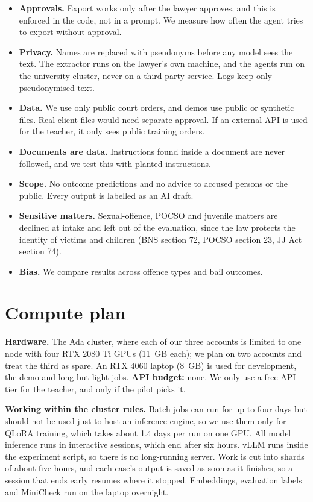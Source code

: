 \documentclass[11pt,a4paper]{article}
\begin{document}
\begin{itemize}
\item \textbf{Approvals.} Export works only after the lawyer approves, and this is enforced in the code, not in a prompt. We measure how often the agent tries to export without approval.
\item \textbf{Privacy.} Names are replaced with pseudonyms before any model sees the text. The extractor runs on the lawyer's own machine, and the agents run on the university cluster, never on a third-party service. Logs keep only pseudonymised text.
\item \textbf{Data.} We use only public court orders, and demos use public or synthetic files. Real client files would need separate approval. If an external API is used for the teacher, it only sees public training orders.
\item \textbf{Documents are data.} Instructions found inside a document are never followed, and we test this with planted instructions.
\item \textbf{Scope.} No outcome predictions and no advice to accused persons or the public. Every output is labelled as an AI draft.
\item \textbf{Sensitive matters.} Sexual-offence, POCSO and juvenile matters are declined at intake and left out of the evaluation, since the law protects the identity of victims and children (BNS section 72, POCSO section 23, JJ Act section 74).
\item \textbf{Bias.} We compare results across offence types and bail outcomes.
\end{itemize}

\section{Compute plan}

\textbf{Hardware.} The Ada cluster, where each of our three accounts is limited to one node with four RTX 2080 Ti GPUs (11~GB each); we plan on two accounts and treat the third as spare. An RTX 4060 laptop (8~GB) is used for development, the demo and long but light jobs. \textbf{API budget:} none. We only use a free API tier for the teacher, and only if the pilot picks it.

\textbf{Working within the cluster rules.} Batch jobs can run for up to four days but should not be used just to host an inference engine, so we use them only for QLoRA training, which takes about 1.4 days per run on one GPU. All model inference runs in interactive sessions, which end after six hours. vLLM runs inside the experiment script, so there is no long-running server. Work is cut into shards of about five hours, and each case's output is saved as soon as it finishes, so a session that ends early resumes where it stopped. Embeddings, evaluation labels and MiniCheck run on the laptop overnight.
\end{document}
